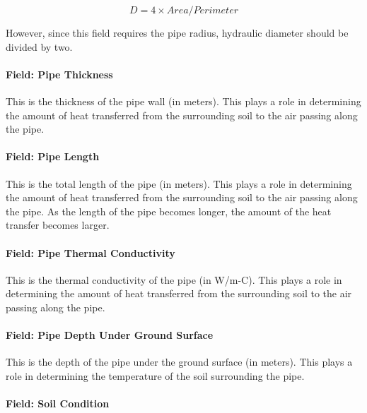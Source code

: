 \begin{equation}
D = 4 \times Area/Perimeter
\end{equation}

However, since this field requires the pipe radius, hydraulic diameter should be divided by two.

\paragraph{Field: Pipe Thickness}\label{field-pipe-thickness}

This is the thickness of the pipe wall (in meters). This plays a role in determining the amount of heat transferred from the surrounding soil to the air passing along the pipe.

\paragraph{Field: Pipe Length}\label{field-pipe-length}

This is the total length of the pipe (in meters). This plays a role in determining the amount of heat transferred from the surrounding soil to the air passing along the pipe. As the length of the pipe becomes longer, the amount of the heat transfer becomes larger.

\paragraph{Field: Pipe Thermal Conductivity}\label{field-pipe-thermal-conductivity}

This is the thermal conductivity of the pipe (in W/m-C). This plays a role in determining the amount of heat transferred from the surrounding soil to the air passing along the pipe.

\paragraph{Field: Pipe Depth Under Ground Surface}\label{field-pipe-depth-under-ground-surface}

This is the depth of the pipe under the ground surface (in meters). This plays a role in determining the temperature of the soil surrounding the pipe.

\paragraph{Field: Soil Condition}\label{field-soil-condition}

